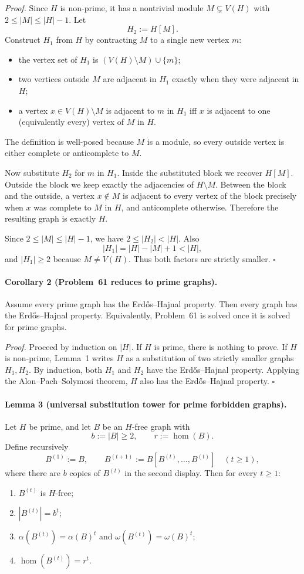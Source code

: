 \emph{Proof.}
Since $H$ is non-prime, it has a nontrivial module $M\subsetneq V(H)$ with $2\le |M|\le |H|-1$.
Let
\[
H_2:=H[M].
\]
Construct $H_1$ from $H$ by contracting $M$ to a single new vertex $m$:
\begin{itemize}
\item the vertex set of $H_1$ is $(V(H)\setminus M)\cup\{m\}$;
\item two vertices outside $M$ are adjacent in $H_1$ exactly when they were adjacent in $H$;
\item a vertex $x\in V(H)\setminus M$ is adjacent to $m$ in $H_1$ iff $x$ is adjacent to one (equivalently every) vertex of $M$ in $H$.
\end{itemize}
The definition is well-posed because $M$ is a module, so every outside vertex is either complete or anticomplete to $M$.

Now substitute $H_2$ for $m$ in $H_1$.
Inside the substituted block we recover $H[M]$.
Outside the block we keep exactly the adjacencies of $H\setminus M$.
Between the block and the outside, a vertex $x\notin M$ is adjacent to every vertex of the block precisely when $x$ was complete to $M$ in $H$, and anticomplete otherwise.
Therefore the resulting graph is exactly $H$.

Since $2\le |M|\le |H|-1$, we have $2\le |H_2|<|H|$.
Also
\[
|H_1|=|H|-|M|+1<|H|,
\]
and $|H_1|\ge 2$ because $M\neq V(H)$.
Thus both factors are strictly smaller.
\hfill$\square$

\medskip
\paragraph{Corollary 2 (Problem~61 reduces to prime graphs).}
Assume every prime graph has the Erd\H{o}s--Hajnal property.
Then every graph has the Erd\H{o}s--Hajnal property.
Equivalently, Problem~61 is solved once it is solved for prime graphs.

\emph{Proof.}
Proceed by induction on $|H|$.
If $H$ is prime, there is nothing to prove.
If $H$ is non-prime, Lemma~1 writes $H$ as a substitution of two strictly smaller graphs $H_1,H_2$.
By induction, both $H_1$ and $H_2$ have the Erd\H{o}s--Hajnal property.
Applying the Alon--Pach--Solymosi theorem, $H$ also has the Erd\H{o}s--Hajnal property.
\hfill$\square$

\medskip
\paragraph{Lemma 3 (universal substitution tower for prime forbidden graphs).}
Let $H$ be prime, and let $B$ be an $H$-free graph with
\[
b:=|B|\ge 2,\qquad r:=\hom(B).
\]
Define recursively
\[
B^{(1)}:=B,\qquad B^{(t+1)}:=B[B^{(t)},\dots,B^{(t)}]
\quad (t\ge 1),
\]
where there are $b$ copies of $B^{(t)}$ in the second display.
Then for every $t\ge 1$:
\begin{enumerate}
\item $B^{(t)}$ is $H$-free;
\item $|B^{(t)}|=b^t$;
\item $\alpha(B^{(t)})=\alpha(B)^t$ and $\omega(B^{(t)})=\omega(B)^t$;
\item $\hom(B^{(t)})=r^t$.
\end{enumerate}

